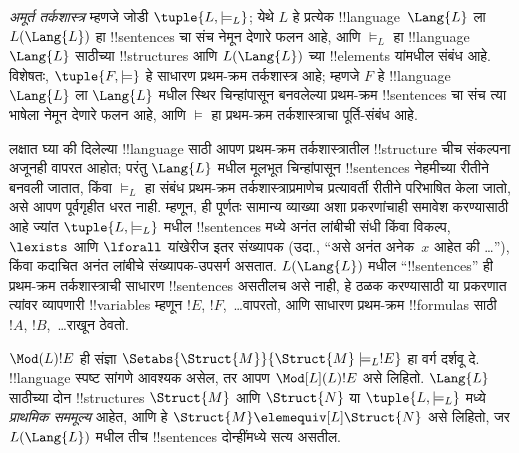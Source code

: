 \documentclass[../../../include/open-logic-section]{subfiles}
\begin{document}

\begin{defn}
\emph{अमूर्त तर्कशास्त्र} म्हणजे जोडी $
\tuple{L, \models_L}$; येथे $L$ हे प्रत्येक !!{language}~$\Lang{L}$
ला $L(\Lang{L})$ हा !!{sentence}s चा संच नेमून देणारे फलन आहे, आणि
$\models_L$ हा !!{language}~$\Lang{L}$ साठीच्या !!{structure}s आणि
$L(\Lang{L})$ च्या !!{element}s यांमधील संबंध आहे. विशेषतः,
$\tuple{F, \models}$ हे साधारण प्रथम-क्रम तर्कशास्त्र आहे; म्हणजे $F$ हे
!!{language}~$\Lang{L}$ ला $\Lang{L}$ मधील स्थिर चिन्हांपासून बनवलेल्या प्रथम-क्रम
!!{sentence}s चा संच त्या भाषेला नेमून देणारे फलन आहे, आणि $\models$ हा
प्रथम-क्रम तर्कशास्त्राचा पूर्ति-संबंध आहे.
\end{defn}

लक्षात घ्या की दिलेल्या !!{language} साठी आपण प्रथम-क्रम तर्कशास्त्रातील
!!{structure} चीच संकल्पना अजूनही वापरत आहोत; परंतु $\Lang{L}$ मधील
मूलभूत चिन्हांपासून !!{sentence}s नेहमीच्या रीतीने बनवली जातात, किंवा
$\models_L$ हा संबंध प्रथम-क्रम तर्कशास्त्राप्रमाणेच प्रत्यावर्ती रीतीने
परिभाषित केला जातो, असे आपण पूर्वगृहीत धरत नाही. म्हणून, ही पूर्णतः
सामान्य व्याख्या अशा प्रकरणांचाही समावेश करण्यासाठी आहे ज्यांत
$\tuple{L,\models_L}$ मधील !!{sentence}s मध्ये अनंत लांबीची संधी किंवा
विकल्प, $\lexists$ आणि $\lforall$ यांखेरीज इतर संख्यापक (उदा.,
``असे अनंत अनेक~$x$ आहेत की \dots''), किंवा कदाचित अनंत लांबीचे
संख्यापक-उपसर्ग असतात. $L(\Lang{L})$ मधील ``!!{sentence}s'' ही
प्रथम-क्रम तर्कशास्त्राची साधारण !!{sentence}s असतीलच असे नाही, हे
ठळक करण्यासाठी या प्रकरणात त्यांवर व्यापणारी !!{variable}s म्हणून $!E$,
$!F$,~\dots वापरतो, आणि साधारण प्रथम-क्रम !!{formula}s साठी $!A$,
$!B$,~\dots राखून ठेवतो.

\begin{defn}
$\Mod(L){!E}$ ही संज्ञा $\Setabs{\Struct{M}}{\Struct{M}
  \models_L !E}$ हा वर्ग दर्शवू दे. !!{language} स्पष्ट सांगणे आवश्यक
असेल, तर आपण $\Mod[L](L){!E}$ असे लिहितो. $\Lang{L}$ साठीच्या दोन
!!{structure}s $\Struct{M}$ आणि $\Struct{N}$ या $\tuple{L, \models_L}$
मध्ये \emph{प्राथमिक सममूल्य} आहेत, आणि हे $\Struct{M} \elemequiv[L]
\Struct{N}$ असे लिहितो, जर $L(\Lang{L})$ मधील तीच !!{sentence}s
दोन्हींमध्ये सत्य असतील.
\end{defn}
\end{document}
